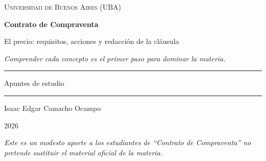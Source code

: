 \documentclass[12pt,oneside]{book}
\newcommand{\universidad}{Universidad de Buenos Aires (UBA)}
\newcommand{\materia}{Contrato de Compraventa}
\newcommand{\titulo}{El precio: requisitos, acciones y redacci\'on de la cl\'ausula}
\newcommand{\autor}{Isaac Edgar Camacho Ocampo}
\newcommand{\anio}{2026}
\begin{document}
\begin{titlepage}

\thispagestyle{empty}

\begin{center}

\vspace*{1cm}

{\large \textsc{\universidad}}

\vspace{3.5cm}

{\Huge \textbf{\materia}}

\vspace{1cm}

{\LARGE \titulo}

\vspace{0.8cm}

\textit{Comprender cada concepto es el primer paso para dominar la materia.}

\vspace{1.2cm}

\rule{0.70\textwidth}{0.5pt}

\vspace{0.5cm}

{\large Apuntes de estudio}

\vspace{0.5cm}

\rule{0.70\textwidth}{0.5pt}

\vfill

{\large \autor}

\vspace{0.3cm}

{\large \anio}

\end{center}

\vfill

\begin{flushleft}
\textit{Este es un modesto aporte a los estudiantes de ``\materia'' no pretende sustituir el material oficial de la materia.}
\end{flushleft}

\end{titlepage}

\tableofcontents

\end{document}
